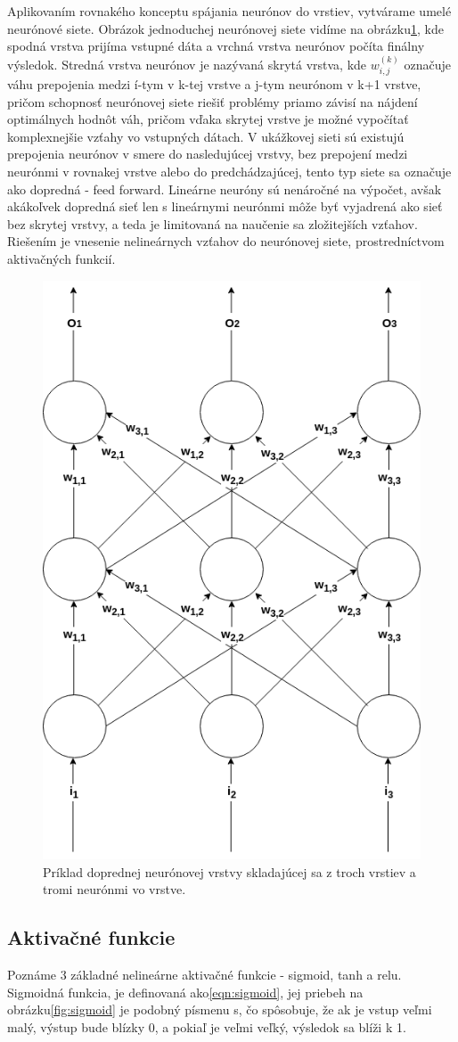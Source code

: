 \indent Aplikovaním rovnakého konceptu spájania neurónov do vrstiev, vytvárame umelé neurónové siete.
Obrázok jednoduchej neurónovej siete vidíme na obrázku\ref{fig:ann}, kde spodná vrstva prijíma vstupné dáta a vrchná vrstva neurónov počíta finálny výsledok.
Stredná vrstva neurónov je nazývaná skrytá vrstva, kde $w_{i, j}^{(k)}$ označuje váhu prepojenia medzi í-tym v k-tej vrstve a j-tym neurónom v k+1 vrstve, pričom schopnosť neurónovej siete riešiť problémy 
priamo závisí na nájdení optimálnych hodnôt váh, pričom vďaka skrytej vrstve je možné vypočítať komplexnejšie vzťahy vo vstupných dátach.
V ukážkovej sieti sú existujú prepojenia neurónov v smere do nasledujúcej vrstvy, bez prepojení medzi neurónmi v rovnakej vrstve alebo do predchádzajúcej, tento typ siete sa označuje ako dopredná - feed forward.
Lineárne neuróny sú nenáročné na výpočet, avšak akákoľvek dopredná sieť len s lineárnymi neurónmi môže byť vyjadrená ako sieť bez skrytej vrstvy, a teda je limitovaná na naučenie sa zložitejších vzťahov.
Riešením je vnesenie nelineárnych vzťahov do neurónovej siete, prostredníctvom aktivačných funkcií.\cite{buduma2017fundamentals}

\begin{figure}[H]
	\centering
	\includegraphics[width=0.5\linewidth]{img/ann}
	\caption{Príklad doprednej neurónovej vrstvy skladajúcej sa z troch vrstiev a tromi neurónmi vo vrstve.}
	\label{fig:ann}
\end{figure}

\subsection{Aktivačné funkcie}\label{activation}
Poznáme 3 základné nelineárne aktivačné funkcie - sigmoid, tanh a relu.
Sigmoidná funkcia, je definovaná ako\eqref{eqn:sigmoid}, jej priebeh na obrázku\ref{fig:sigmoid} je podobný písmenu s, čo spôsobuje, že ak je vstup veľmi malý, výstup bude blízky 0, a pokiaľ je veľmi veľký, výsledok sa blíži k 1.

